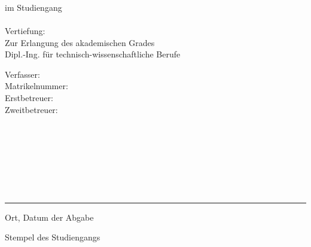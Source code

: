 \begin{titlepage}
\centering
	\sodef{}
	 \\
	\vspace{0,53cm}
	{\huge\bfseries \Projekttitel\\}
	\vspace{0,9cm}
	{\large \Projektuntertitel\\}
	\vspace{0,6cm}
	{\large im Studiengang\\}
	{\large\bfseries \Studiengang \\}
	{\large Vertiefung: \Vertiefungsrichtung\\}
	\vspace{0,53cm}
	{Zur Erlangung des akademischen Grades\\}
	{Dipl.-Ing. für technisch-wissenschaftliche Berufe\\}
	\vspace{\fill}
	\raggedright
\begin{minipage}{5,0cm}
	\sffamily
	\raggedright
	Verfasser: \\
	\vspace{\baselineskip}
	Matrikelnummer:\\
	\vspace{\baselineskip}
	Erstbetreuer:\\
	\vspace{\baselineskip}
	Zweitbetreuer:\\
	\vspace{\baselineskip}
	~\\
\end{minipage}
\begin{minipage}{0.45\textwidth}
	\sffamily
	\raggedright
	\Student \\
	\vspace{\baselineskip} 
	\Matrikelnummer\\
	\vspace{\baselineskip}
	\BetreuerA \\
	\vspace{\baselineskip}	
	\BetreuerB \\
	\vspace{\baselineskip}
	\BetreuerC \\
\end{minipage}
\hfill
\begin{minipage}{5,0cm}
	\sffamily
	\raggedright
	\hfill
\end{minipage}
\begin{minipage}{0.45\textwidth}
	\sffamily
	\raggedright

\end{minipage}


\vspace{26mm}
\parbox{7.7cm}{\centering\hrule\medskip Ort, Datum der Abgabe}
\vspace{0.0cm}
\hfill
\parbox{0.7cm}{ }
\parbox{6cm}{\raggedleft\medskip Stempel des Studiengangs}
\vspace{0.0cm}
\end{titlepage}
\cleardoublepage
\restoregeometry
\clearscrheadings%
\footline
\renewcommand{\arbeit}{DIPLOMARBEIT }
